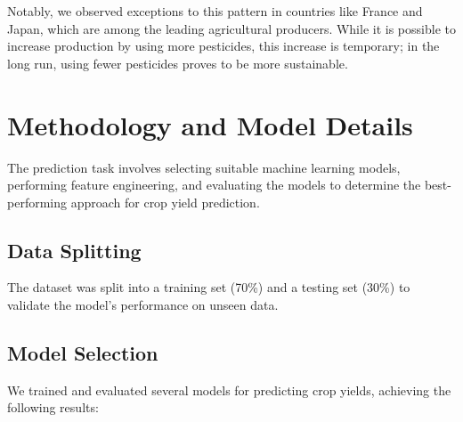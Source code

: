 \documentclass[10pt,twocolumn,letterpaper]{article}
\begin{document}
Notably, we observed exceptions to this pattern in countries like France and Japan, which are among the leading agricultural producers. While it is possible to increase production by using more pesticides, this increase is temporary; in the long run, using fewer pesticides proves to be more sustainable.


\section{Methodology and Model Details}
The prediction task involves selecting suitable machine learning models, performing feature engineering, and evaluating the models to determine the best-performing approach for crop yield prediction.

\subsection{Data Splitting}
 The dataset was split into a training set (70\%) and a testing set (30\%) to validate the model's performance on unseen data.


\subsection{Model Selection}

We trained and evaluated several models for predicting crop yields, achieving the following results:
\end{document}
